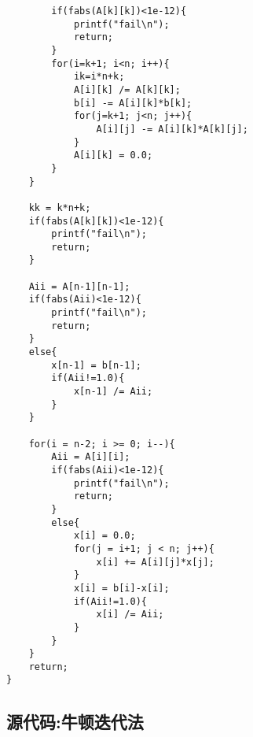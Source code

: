 \documentclass[UTF8]{ctexart}
\begin{document}
\begin{verbatim}
		if(fabs(A[k][k])<1e-12){
			printf("fail\n"); 
			return;
		}
		for(i=k+1; i<n; i++){
			ik=i*n+k;
			A[i][k] /= A[k][k];
			b[i] -= A[i][k]*b[k];  
			for(j=k+1; j<n; j++){ 
				A[i][j] -= A[i][k]*A[k][j];
			} 
			A[i][k] = 0.0;
		}
	}
	
	kk = k*n+k;
	if(fabs(A[k][k])<1e-12){
		printf("fail\n"); 
		return;
	}  
	
	Aii = A[n-1][n-1];
	if(fabs(Aii)<1e-12){
		printf("fail\n"); 
		return;
	}
	else{ 
		x[n-1] = b[n-1];
		if(Aii!=1.0){ 
			x[n-1] /= Aii;
		} 
	}
	
	for(i = n-2; i >= 0; i--){
		Aii = A[i][i];
		if(fabs(Aii)<1e-12){
			printf("fail\n"); 
			return;
		}
		else{
			x[i] = 0.0;   
			for(j = i+1; j < n; j++){   
				x[i] += A[i][j]*x[j];
			} 
			x[i] = b[i]-x[i];
			if(Aii!=1.0){ 
				x[i] /= Aii;
			}
		}
	}
	return;
}
\end{verbatim}

\subsection{源代码:牛顿迭代法}
\end{document}
